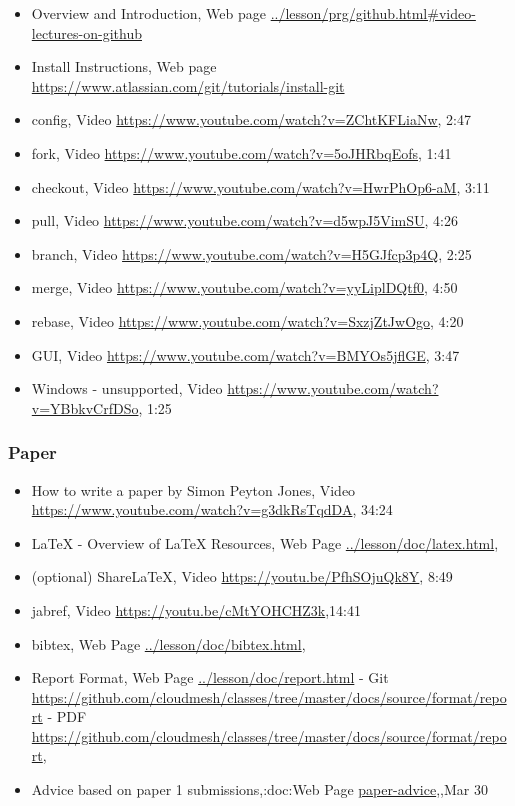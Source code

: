 \begin{itemize}
\item Overview and Introduction, Web page \url{../lesson/prg/github.html#video-lectures-on-github}
\item Install Instructions, Web page  \url{https://www.atlassian.com/git/tutorials/install-git}
 
\item config, Video \url{https://www.youtube.com/watch?v=ZChtKFLiaNw}, 2:47
\item fork, Video \url{https://www.youtube.com/watch?v=5oJHRbqEofs}, 1:41
\item checkout, Video \url{https://www.youtube.com/watch?v=HwrPhOp6-aM}, 3:11
\item pull, Video \url{https://www.youtube.com/watch?v=d5wpJ5VimSU}, 4:26
\item branch, Video \url{https://www.youtube.com/watch?v=H5GJfcp3p4Q}, 2:25
\item merge, Video \url{https://www.youtube.com/watch?v=yyLiplDQtf0}, 4:50
\item rebase, Video \url{https://www.youtube.com/watch?v=SxzjZtJwOgo}, 4:20
\item GUI, Video \url{https://www.youtube.com/watch?v=BMYOs5jflGE}, 3:47
\item Windows - unsupported, Video \url{https://www.youtube.com/watch?v=YBbkvCrfDSo}, 1:25
\end{itemize}

\subsubsection{Paper}


\begin{itemize}
\item How to write a paper by Simon Peyton Jones, Video \url{https://www.youtube.com/watch?v=g3dkRsTqdDA}, 34:24
\item LaTeX - Overview of LaTeX Resources, Web Page \url{../lesson/doc/latex.html},
\item (optional) ShareLaTeX, Video \url{https://youtu.be/PfhSOjuQk8Y}, 8:49
\item jabref, Video \url{https://youtu.be/cMtYOHCHZ3k},14:41
\item bibtex, Web Page \url{../lesson/doc/bibtex.html},
\item Report Format, Web Page \url{../lesson/doc/report.html} - Git \url{https://github.com/cloudmesh/classes/tree/master/docs/source/format/report} - PDF \url{https://github.com/cloudmesh/classes/tree/master/docs/source/format/report},
\item Advice based on paper 1 submissions,:doc:Web Page \url{paper-advice},,Mar 30
\end{itemize}
